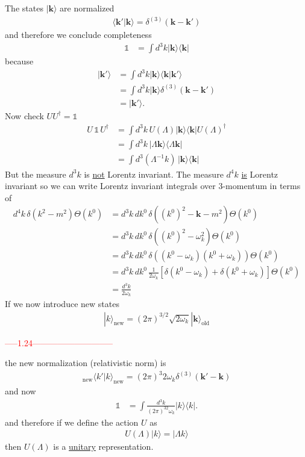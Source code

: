 \documentclass{article}
\begin{document}
The states $|\mathbf{k}\rangle$ are normalized
\begin{align}
\langle\mathbf{k}'|\mathbf{k}\rangle=\delta^{(3)}(\mathbf{k}-\mathbf{k}')
\end{align}
and therefore we conclude completeness
\begin{align}
\mathbb{1}&=\int d^3k|\mathbf{k}\rangle\langle\mathbf{k}|
\end{align}
because
\begin{align}
|\mathbf{k}'\rangle
&=\int d^3k|\mathbf{k}\rangle\langle\mathbf{k}|\mathbf{k}'\rangle\\
&=\int d^3k|\mathbf{k}\rangle\delta^{(3)}(\mathbf{k}-\mathbf{k}')\\
&=|\mathbf{k}'\rangle.
\end{align}
Now check $UU^\dagger=\mathbb{1}$
\begin{align}
U\,\mathbb{1}\,U^\dagger
&=\int d^3k\,U(\Lambda)|\mathbf{k}\rangle\langle \mathbf{k}|U(\Lambda)^\dagger\\
&=\int d^3k\,|\Lambda\mathbf{k}\rangle\langle \Lambda\mathbf{k}|\\
&=\int d^3(\Lambda^{-1}k)\,|\mathbf{k}\rangle\langle \mathbf{k}|
\end{align}
But the measure $d^3k$ is \underline{not} Lorentz invariant. The measure $d^4k$ \underline{is} Lorentz invariant so we can write Lorentz invariant integrals over 3-momentum in terms of
\begin{align}
d^4k\,\delta(k^2-m^2)\Theta(k^0)
&=d^3k\,dk^0\,\delta\left((k^0)^2-\mathbf{k}-m^2\right)\Theta(k^0)\\
&=d^3k\,dk^0\,\delta\left((k^0)^2-\omega_k^2\right)\Theta(k^0)\\
&=d^3k\,dk^0\,\delta\left((k^0-\omega_k)(k^0+\omega_k)\right)\Theta(k^0)\\
&=d^3k\,dk^0\,\frac{1}{2\omega_k}\left[\delta(k^0-\omega_k)+\delta(k^0+\omega_k)\right]\Theta(k^0)\\
&=\frac{d^3k}{2\omega_k}
\end{align}
If we now introduce new states
\begin{align}
|k\rangle_\text{new}=(2\pi)^{3/2}\sqrt{2\omega_k}|\mathbf{k}\rangle_\text{old}
\end{align}

\textcolor{red}{-----1.24-----------------------------}
\newline

the new normalization (relativistic norm) is
\begin{align}
{}_\text{new}\langle k'|k\rangle_\text{new}
=(2\pi)^3 2\omega_k\delta^{(3)}(\mathbf{k}'-\mathbf{k})
\end{align}
and now
\begin{align}
\mathbb{1}&=\int \frac{d^3k}{(2\pi)^32\omega_k}|k\rangle\langle k|.
\end{align}
and therefore if we define the action $U$ as 
\begin{align}
U(\Lambda)|k\rangle=|\Lambda k \rangle
\end{align}
then $U(\Lambda)$ is a \underline{unitary} representation.
\end{document}
